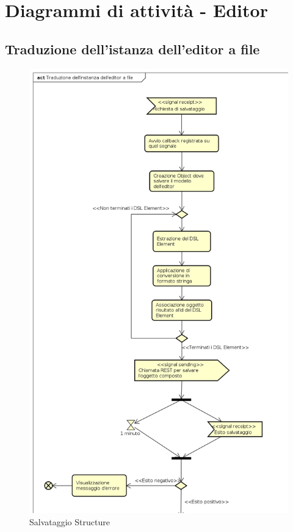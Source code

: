 \section{Diagrammi di attività - Editor}
    \subsection{Traduzione dell'istanza dell'editor a file}
    \begin{figure}[H]
      \centering
      \includegraphics[width=.7\textwidth]{res/img/salvataggio.png}
      \caption{Salvataggio  Structure}
      \label{fig:salvataggio}
    \end{figure}
